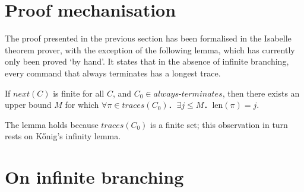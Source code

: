 \documentclass{llncs}
\newcommand\Next{\mathit{next}}
\newcommand\terminates{\mathit{always\text{-}terminates}}
\newcommand\length{\mathrm{len}}
\newcommand\tracesfrom{\mathit{traces}}
\begin{document}
\section{Proof mechanisation}

The proof presented in the previous section has been formalised in the Isabelle theorem prover, with the exception of the following lemma, which has currently only been proved `by hand'. It states that in the absence of infinite branching, every command that always terminates has a longest trace.
\begin{lemma}
If $\Next(C)$ is finite for all $C$, and $C_0 ∈ \terminates$, then there exists an upper bound $M$ for which $∀π ∈ \tracesfrom(C_0)．∃j≤M．\length(π) = j$.
\end{lemma}
The lemma holds because $\tracesfrom(C_0)$ is a finite set; this observation in turn rests on K\H{o}nig's infinity lemma.

\section{On infinite branching}
\end{document}
